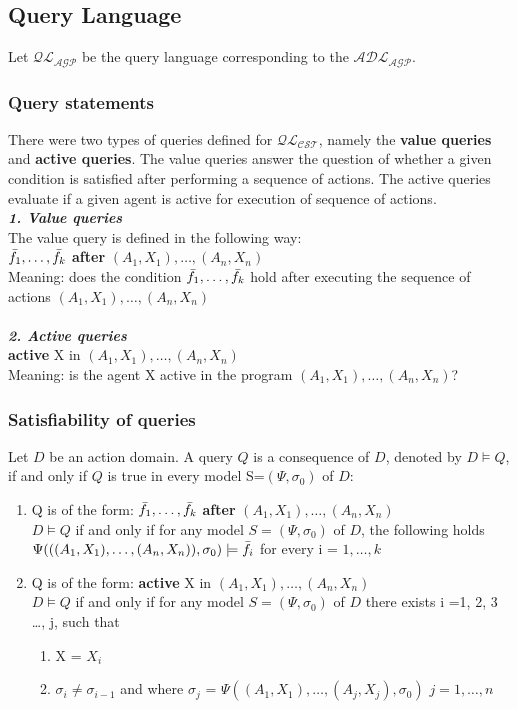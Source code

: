 \documentclass[a4paper]{article}
\begin{document}
\subsection{Query Language}
%
Let $\mathcal{QL_{AGP}}$ be the query language corresponding to the $\mathcal{ADL_{AGP}}$. 
%
\subsubsection{Query statements}
%
There were two types of queries defined for $\mathcal{QL_{CST}}$, namely the \textbf{value queries} and \textbf{active queries}. The value queries answer the question of whether a given condition is satisfied after performing a sequence of actions. The active queries evaluate if a given agent  is active for execution of sequence of actions.
\\[0.5\baselineskip]
\textbf{\textit{1. Value queries}}
\\[0.5\baselineskip]
The value query is defined in the following way:\\[0.5\baselineskip]
 $\Bar{f_1},\dotsc,\Bar{f_k}$ \textbf{after} $(A_1, X_1),\dotsc,(A_n, X_n)$ \\[0.5\baselineskip] 
Meaning: does the condition $\Bar{f_1},\dotsc,\Bar{f_k}$ hold after executing the sequence of actions $(A_1, X_1),\dotsc,(A_n, X_n)$
\\\\
\textbf{\textit{2. Active queries}}
\\[0.5\baselineskip]
\textbf{active} X in $(A_1, X_1),\dotsc,(A_n, X_n)$\\[0.5\baselineskip] 
Meaning: is the agent X active in the program $(A_1, X_1),\dotsc,(A_n, X_n)$?  \\[0.5\baselineskip]

\subsubsection{Satisfiability of queries}
Let $D$ be an action domain. A query $Q$ is a consequence of $D$, denoted by $D \models Q$, if and only if $Q$ is true in every model S=$(\Psi, \sigma_0)$ of $D$:
\begin{enumerate}
  \item Q is of the form: $\Bar{f_1},\dotsc,\Bar{f_k}$ \textbf{after} $(A_1, X_1),\dotsc,(A_n, X_n)$ \\[0.5\baselineskip] 
    $D \models Q$ if and only if for any model $S=(\Psi,\sigma_0)$ of $D$, 
   the following holds $\Psi(((A_1,X_1),\dotsc,(A_n,X_n)),\sigma_0)\models \Bar{f_i}$ for every i = $1, \dotsc, k$
  \item Q is of the form: \textbf{active} X in $(A_1, X_1),\dotsc,(A_n, X_n)$\\[0.5\baselineskip] 
    $D \models Q$ if and only if for any model $S=(\Psi,\sigma_0)$ of $D$ 
    there exists i =1, 2, 3 \ldots, j, such that 
    \begin{enumerate}
      \item X = $X_i$
      \item $\sigma_i \neq \sigma_{i-1}$ and where $\sigma_j$ = $\Psi((A_1, X_1),\dotsc,(A_j, X_j),\sigma_0)$ $j = 1, \dotsc, n$     
    \end{enumerate}
\end{enumerate}
\end{document}

